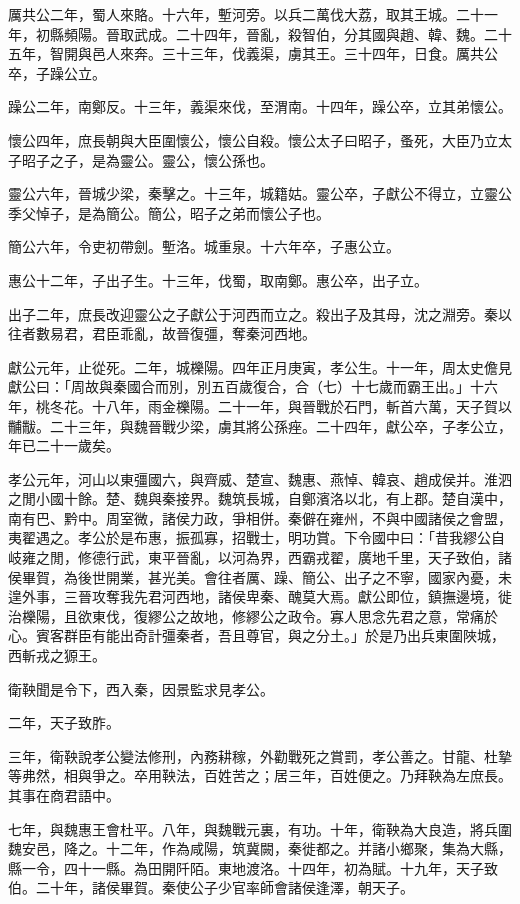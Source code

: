 \begin{pinyinscope}
厲共公二年，蜀人來賂。十六年，塹河旁。以兵二萬伐大荔，取其王城。二十一年，初縣頻陽。晉取武成。二十四年，晉亂，殺智伯，分其國與趙、韓、魏。二十五年，智開與邑人來奔。三十三年，伐義渠，虜其王。三十四年，日食。厲共公卒，子躁公立。

躁公二年，南鄭反。十三年，義渠來伐，至渭南。十四年，躁公卒，立其弟懷公。

懷公四年，庶長朝與大臣圍懷公，懷公自殺。懷公太子曰昭子，蚤死，大臣乃立太子昭子之子，是為靈公。靈公，懷公孫也。

靈公六年，晉城少梁，秦擊之。十三年，城籍姑。靈公卒，子獻公不得立，立靈公季父悼子，是為簡公。簡公，昭子之弟而懷公子也。

簡公六年，令吏初帶劍。塹洛。城重泉。十六年卒，子惠公立。

惠公十二年，子出子生。十三年，伐蜀，取南鄭。惠公卒，出子立。

出子二年，庶長改迎靈公之子獻公于河西而立之。殺出子及其母，沈之淵旁。秦以往者數易君，君臣乖亂，故晉復彊，奪秦河西地。

獻公元年，止從死。二年，城櫟陽。四年正月庚寅，孝公生。十一年，周太史儋見獻公曰：「周故與秦國合而別，別五百歲復合，合（七）十七歲而霸王出。」十六年，桃冬花。十八年，雨金櫟陽。二十一年，與晉戰於石門，斬首六萬，天子賀以黼黻。二十三年，與魏晉戰少梁，虜其將公孫痤。二十四年，獻公卒，子孝公立，年已二十一歲矣。

孝公元年，河山以東彊國六，與齊威、楚宣、魏惠、燕悼、韓哀、趙成侯并。淮泗之閒小國十餘。楚、魏與秦接界。魏筑長城，自鄭濱洛以北，有上郡。楚自漢中，南有巴、黔中。周室微，諸侯力政，爭相併。秦僻在雍州，不與中國諸侯之會盟，夷翟遇之。孝公於是布惠，振孤寡，招戰士，明功賞。下令國中曰：「昔我繆公自岐雍之閒，修德行武，東平晉亂，以河為界，西霸戎翟，廣地千里，天子致伯，諸侯畢賀，為後世開業，甚光美。會往者厲、躁、簡公、出子之不寧，國家內憂，未遑外事，三晉攻奪我先君河西地，諸侯卑秦、醜莫大焉。獻公即位，鎮撫邊境，徙治櫟陽，且欲東伐，復繆公之故地，修繆公之政令。寡人思念先君之意，常痛於心。賓客群臣有能出奇計彊秦者，吾且尊官，與之分土。」於是乃出兵東圍陜城，西斬戎之獂王。

衛鞅聞是令下，西入秦，因景監求見孝公。

二年，天子致胙。

三年，衛鞅說孝公變法修刑，內務耕稼，外勸戰死之賞罰，孝公善之。甘龍、杜摯等弗然，相與爭之。卒用鞅法，百姓苦之；居三年，百姓便之。乃拜鞅為左庶長。其事在商君語中。

七年，與魏惠王會杜平。八年，與魏戰元裏，有功。十年，衛鞅為大良造，將兵圍魏安邑，降之。十二年，作為咸陽，筑冀闕，秦徙都之。并諸小鄉聚，集為大縣，縣一令，四十一縣。為田開阡陌。東地渡洛。十四年，初為賦。十九年，天子致伯。二十年，諸侯畢賀。秦使公子少官率師會諸侯逢澤，朝天子。


\end{pinyinscope}
